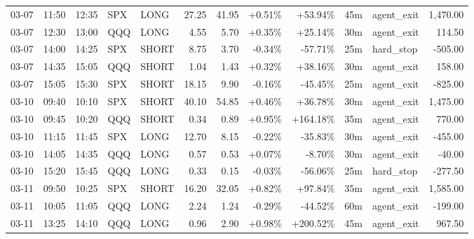 \documentclass[11pt,a4paper,twoside]{article}
\begin{document}
\begin{center}
\begin{longtable}{>{\color{txtmain}}l l l l l r r r r r >{\color{txtmain}}l r}
03-07 & 11:50 & 12:35 & SPX & LONG & 27.25 & 41.95 & \textcolor{wingreen}{+0.51\%} & \textcolor{wingreen}{+53.94\%} & 45m & agent\_exit & \textcolor{wingreen}{1,470.00} \\
03-07 & 12:30 & 13:00 & QQQ & LONG & 4.55 & 5.70 & \textcolor{wingreen}{+0.35\%} & \textcolor{wingreen}{+25.14\%} & 30m & agent\_exit & \textcolor{wingreen}{114.50} \\
03-07 & 14:00 & 14:25 & SPX & SHORT & 8.75 & 3.70 & \textcolor{lossred}{-0.34\%} & \textcolor{lossred}{-57.71\%} & 25m & hard\_stop & \textcolor{lossred}{-505.00} \\
03-07 & 14:35 & 15:05 & QQQ & SHORT & 1.04 & 1.43 & \textcolor{wingreen}{+0.32\%} & \textcolor{wingreen}{+38.16\%} & 30m & agent\_exit & \textcolor{wingreen}{158.00} \\
03-07 & 15:05 & 15:30 & SPX & SHORT & 18.15 & 9.90 & \textcolor{lossred}{-0.16\%} & \textcolor{lossred}{-45.45\%} & 25m & agent\_exit & \textcolor{lossred}{-825.00} \\
03-10 & 09:40 & 10:10 & SPX & SHORT & 40.10 & 54.85 & \textcolor{wingreen}{+0.46\%} & \textcolor{wingreen}{+36.78\%} & 30m & agent\_exit & \textcolor{wingreen}{1,475.00} \\
03-10 & 09:45 & 10:20 & QQQ & SHORT & 0.34 & 0.89 & \textcolor{wingreen}{+0.95\%} & \textcolor{wingreen}{+164.18\%} & 35m & agent\_exit & \textcolor{wingreen}{770.00} \\
03-10 & 11:15 & 11:45 & SPX & LONG & 12.70 & 8.15 & \textcolor{lossred}{-0.22\%} & \textcolor{lossred}{-35.83\%} & 30m & agent\_exit & \textcolor{lossred}{-455.00} \\
03-10 & 14:05 & 14:35 & QQQ & LONG & 0.57 & 0.53 & \textcolor{wingreen}{+0.07\%} & \textcolor{lossred}{-8.70\%} & 30m & agent\_exit & \textcolor{lossred}{-40.00} \\
03-10 & 15:20 & 15:45 & QQQ & LONG & 0.33 & 0.15 & \textcolor{lossred}{-0.03\%} & \textcolor{lossred}{-56.06\%} & 25m & hard\_stop & \textcolor{lossred}{-277.50} \\
03-11 & 09:50 & 10:25 & SPX & SHORT & 16.20 & 32.05 & \textcolor{wingreen}{+0.82\%} & \textcolor{wingreen}{+97.84\%} & 35m & agent\_exit & \textcolor{wingreen}{1,585.00} \\
03-11 & 10:05 & 11:05 & QQQ & LONG & 2.24 & 1.24 & \textcolor{lossred}{-0.29\%} & \textcolor{lossred}{-44.52\%} & 60m & agent\_exit & \textcolor{lossred}{-199.00} \\
03-11 & 13:25 & 14:10 & QQQ & LONG & 0.96 & 2.90 & \textcolor{wingreen}{+0.98\%} & \textcolor{wingreen}{+200.52\%} & 45m & agent\_exit & \textcolor{wingreen}{967.50} \\

\end{longtable}
\end{center}
\end{document}
